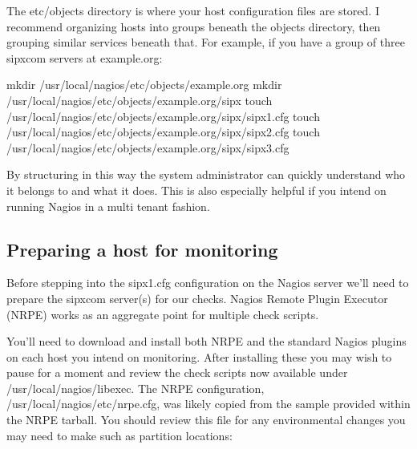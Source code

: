 \documentclass[letterpaper,10pt,english]{sphinxmanual}
\begin{document}
The etc/objects directory is where your host configuration files are stored. I recommend organizing hosts into groups beneath the objects directory, then grouping similar services beneath that. For example, if you have a group of three sipxcom servers at example.org:

\begin{sphinxVerbatim}[commandchars=\\\{\}]
\PYGZdl{} mkdir /usr/local/nagios/etc/objects/example.org
\PYGZdl{} mkdir /usr/local/nagios/etc/objects/example.org/sipx
\PYGZdl{} touch /usr/local/nagios/etc/objects/example.org/sipx/sipx1.cfg
\PYGZdl{} touch /usr/local/nagios/etc/objects/example.org/sipx/sipx2.cfg
\PYGZdl{} touch /usr/local/nagios/etc/objects/example.org/sipx/sipx3.cfg
\end{sphinxVerbatim}

By structuring in this way the system administrator can quickly understand who it belongs to and what it does. This is also especially helpful if you intend on running Nagios in a multi tenant fashion.


\subsection{Preparing a host for monitoring}
\label{\detokenize{monitoring:preparing-a-host-for-monitoring}}
Before stepping into the sipx1.cfg configuration on the Nagios server we’ll need to prepare the sipxcom server(s) for our checks. Nagios Remote Plugin Executor (NRPE) works as an aggregate point for multiple check scripts.
\begin{quote}

\end{quote}

You’ll need to download and install both NRPE and the standard Nagios plugins on each host you intend on monitoring. After installing these you may wish to pause for a moment and review the check scripts now available under /usr/local/nagios/libexec. The NRPE configuration, /usr/local/nagios/etc/nrpe.cfg, was likely copied from the sample provided within the NRPE tarball. You should review this file for any environmental changes you may need to make such as partition locations:
\end{document}
